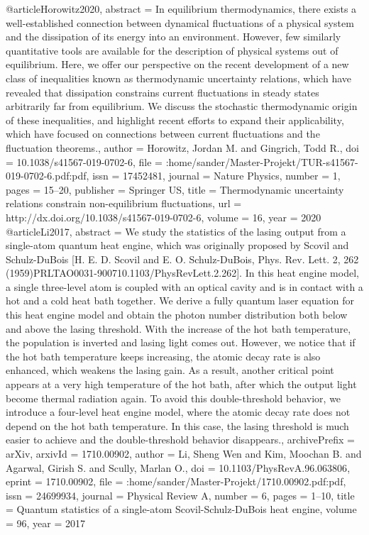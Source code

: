 \documentclass[12pt,a4paper]{article}
\begin{document}
@article{Horowitz2020,
abstract = {In equilibrium thermodynamics, there exists a well-established connection between dynamical fluctuations of a physical system and the dissipation of its energy into an environment. However, few similarly quantitative tools are available for the description of physical systems out of equilibrium. Here, we offer our perspective on the recent development of a new class of inequalities known as thermodynamic uncertainty relations, which have revealed that dissipation constrains current fluctuations in steady states arbitrarily far from equilibrium. We discuss the stochastic thermodynamic origin of these inequalities, and highlight recent efforts to expand their applicability, which have focused on connections between current fluctuations and the fluctuation theorems.},
author = {Horowitz, Jordan M. and Gingrich, Todd R.},
doi = {10.1038/s41567-019-0702-6},
file = {:home/sander/Master-Projekt/TUR-s41567-019-0702-6.pdf:pdf},
issn = {17452481},
journal = {Nature Physics},
number = {1},
pages = {15--20},
publisher = {Springer US},
title = {{Thermodynamic uncertainty relations constrain non-equilibrium fluctuations}},
url = {http://dx.doi.org/10.1038/s41567-019-0702-6},
volume = {16},
year = {2020}
}
@article{Li2017,
abstract = {We study the statistics of the lasing output from a single-atom quantum heat engine, which was originally proposed by Scovil and Schulz-DuBois [H. E. D. Scovil and E. O. Schulz-DuBois, Phys. Rev. Lett. 2, 262 (1959)PRLTAO0031-900710.1103/PhysRevLett.2.262]. In this heat engine model, a single three-level atom is coupled with an optical cavity and is in contact with a hot and a cold heat bath together. We derive a fully quantum laser equation for this heat engine model and obtain the photon number distribution both below and above the lasing threshold. With the increase of the hot bath temperature, the population is inverted and lasing light comes out. However, we notice that if the hot bath temperature keeps increasing, the atomic decay rate is also enhanced, which weakens the lasing gain. As a result, another critical point appears at a very high temperature of the hot bath, after which the output light become thermal radiation again. To avoid this double-threshold behavior, we introduce a four-level heat engine model, where the atomic decay rate does not depend on the hot bath temperature. In this case, the lasing threshold is much easier to achieve and the double-threshold behavior disappears.},
archivePrefix = {arXiv},
arxivId = {1710.00902},
author = {Li, Sheng Wen and Kim, Moochan B. and Agarwal, Girish S. and Scully, Marlan O.},
doi = {10.1103/PhysRevA.96.063806},
eprint = {1710.00902},
file = {:home/sander/Master-Projekt/1710.00902.pdf:pdf},
issn = {24699934},
journal = {Physical Review A},
number = {6},
pages = {1--10},
title = {{Quantum statistics of a single-atom Scovil-Schulz-DuBois heat engine}},
volume = {96},
year = {2017}
}
\end{document}
